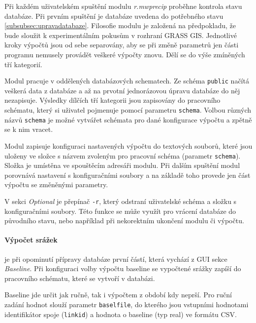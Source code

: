 \documentclass[a4paper,12pt,oneside]{report}
\begin{document}
Při každém uživatelském spuštění modulu \textit{r.mwprecip } proběhne kontrola stavu databáze. Při prvním spuštění je databáze uvedena do potřebného stavu \ref{subsubsec:upravadatabaze}. Filosofie modulu je založená na předpokladu, že bude sloužit k experimentálním pokusům v rozhraní GRASS GIS. Jednotlivé kroky výpočtů jsou od sebe separovány, aby se při změně parametrů jen části programu nemusely provádět veškeré výpočty znovu. Dělí se do výše zmíněných tří kategorií. 

Modul pracuje v oddělených databázových schematech. Ze schéma \texttt{public} načítá veškerá data z databáze a až na prvotní jednorázovou úpravu databáze do něj nezapisuje. Výsledky dílčích tří kategorii jsou zapisovány do pracovního schématu, který si uživatel pojmenuje pomocí parametru \texttt{schema}.  Volbou různých názvů  \texttt{schema} je možné vytvářet schémata pro dané konfigurace výpočtu a zpětně se k nim vracet.

Modul zapisuje konfiguraci nastavených výpočtu do textových souborů, které jsou uloženy ve složce s názvem zvoleným pro pracovní schéma (parametr \texttt{schema}). Složka je umístěna ve spouštěcím adresáři modulu. Při dalším spuštění modul porovnává nastavení s konfiguračními soubory a na základě toho provede jen   část výpočtu se změněnými parametry. 

V sekci \textit{Optional} je přepínač \texttt{-r}, který odstraní uživatelské schéma a složku s konfiguračními soubory. Této funkce se může využít pro vrácení databáze do původního stavu, nebo například při nekorektním ukončení modulu či výpočtu.


\paragraph*{Výpočet srážek} je při opominutí přípravy databáze první částí, která vychází z \acs{GUI} sekce \textit{Baseline}. Při konfiguraci volby výpočtu baseline se vypočtené srážky zapíší do pracovního schématu, které se vytvoří v databázi.

Baseline jde určit jak ručně,  tak i výpočtem z období kdy neprší. 
Pro ruční zadání hodnot slouží parametr \texttt{baselfile}, do kterého jsou vstupními hodnotami identifikátor spoje (\texttt{linkid}) a hodnota o baseline (typ real) ve formátu \acs{CSV}.
\end{document}
